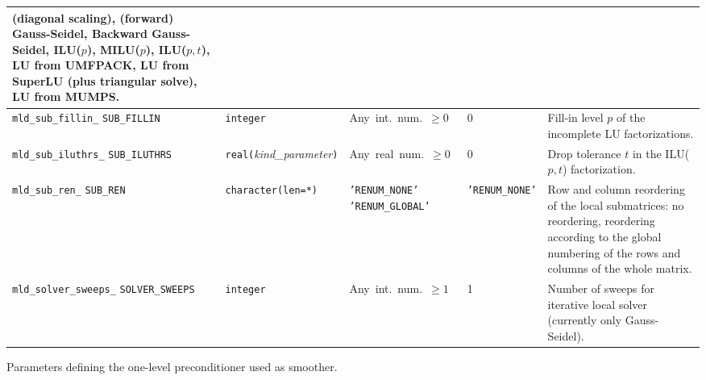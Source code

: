 \begin{center}
\begin{tabular}{|p{3.5cm}|l|p{3.2cm}|l|p{5cm}|}
                           (diagonal scaling),
                           (forward) Gauss-Seidel, Backward
                           Gauss-Seidel, ILU($p$),  MILU($p$),
                           ILU($p,t$), LU from UMFPACK, LU  from 
                           SuperLU (plus triangular solve), LU from MUMPS. \\ \hline  
\verb|mld_sub_fillin_| \break \verb|SUB_FILLIN|  & \verb|integer|
                         & Any~int.~num.~$\ge 0$
                         & 0
                         & Fill-in level $p$ of the incomplete LU factorizations. \\ \hline
\verb|mld_sub_iluthrs_| \break \verb|SUB_ILUTHRS|  & \verb|real(|\emph{kind\_parameter}\verb|)|
                         & Any~real~num.~$\ge 0$
                         & 0
                         & Drop tolerance $t$ in the ILU($p,t$) factorization. \\ \hline
\verb|mld_sub_ren_| \break \verb|SUB_REN|   & \verb|character(len=*)|
                         & \texttt{'RENUM\_NONE'}  \texttt{'RENUM\_GLOBAL'} %
                         & \texttt{'RENUM\_NONE'}
                         & Row and column reordering of the local submatrices: no reordering,
                           reordering according to the global numbering of the rows and columns of
                           the whole matrix. \\
\verb|mld_solver_sweeps_| \break \verb|SOLVER_SWEEPS|  & \verb|integer|
                         & Any~int.~num.~$\ge 1$
                         & 1
                         & Number of sweeps for iterative local solver
                           (currently only Gauss-Seidel). \\ \hline
\hline
\end{tabular}
\end{center}
\caption{Parameters defining the one-level preconditioner used as smoother.
\label{tab:p_smoother}}  
\esideways
                   
